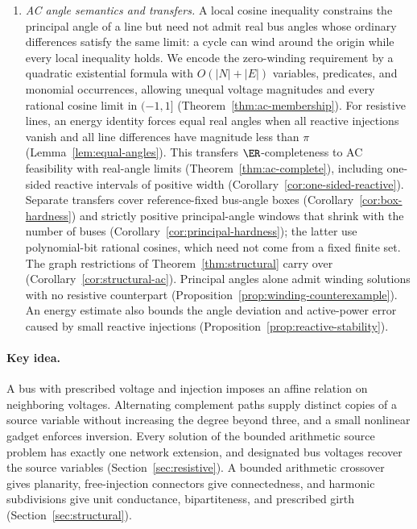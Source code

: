 \begin{enumerate}
\item \emph{AC angle semantics and transfers.}
A local cosine inequality constrains the principal angle of a line but need
not admit real bus angles whose ordinary differences satisfy the same limit:
a cycle can wind around the origin while every local inequality holds. We
encode the zero-winding requirement by a quadratic existential formula with
$O(|N|+|E|)$ variables, predicates, and monomial occurrences, allowing
unequal voltage magnitudes and every rational cosine limit in $(-1,1]$
(Theorem~\ref{thm:ac-membership}). For resistive lines, an energy identity
forces equal real angles when all reactive injections vanish and all line
differences have magnitude less than $\pi$ (Lemma~\ref{lem:equal-angles}).
This transfers $\ER$-completeness to AC feasibility with real-angle limits
(Theorem~\ref{thm:ac-complete}), including one-sided reactive intervals of
positive width (Corollary~\ref{cor:one-sided-reactive}). Separate transfers
cover reference-fixed bus-angle boxes (Corollary~\ref{cor:box-hardness})
and strictly positive principal-angle windows that shrink with the number
of buses (Corollary~\ref{cor:principal-hardness}); the latter use
polynomial-bit rational cosines, which need not come from a fixed finite
set. The graph restrictions of Theorem~\ref{thm:structural} carry over
(Corollary~\ref{cor:structural-ac}). Principal angles alone admit winding
solutions with no resistive counterpart
(Proposition~\ref{prop:winding-counterexample}). An energy estimate also
bounds the angle deviation and active-power error caused by small reactive
injections (Proposition~\ref{prop:reactive-stability}).
\end{enumerate}

\paragraph{Key idea.}
A bus with prescribed voltage and injection imposes an affine relation on
neighboring voltages. Alternating complement paths supply distinct copies
of a source variable without increasing the degree beyond three, and a
small nonlinear gadget enforces inversion. Every solution of the bounded
arithmetic source problem has exactly one network extension, and designated
bus voltages recover the source variables (Section~\ref{sec:resistive}).
A bounded arithmetic crossover gives planarity, free-injection connectors
give connectedness, and harmonic subdivisions give unit conductance,
bipartiteness, and prescribed girth (Section~\ref{sec:structural}).

